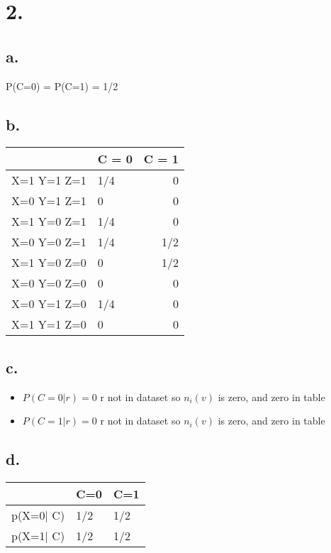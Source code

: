 \documentclass[11pt]{article}
\begin{document}
\section*{2.}
\label{sec:org259a571}
\subsection*{a.}
\label{sec:orgfb60618}
P(C=0) = P(C=1) = 1/2
\subsection*{b.}
\label{sec:org15cf63a}
\begin{center}
\begin{tabular}{l|lr}
 & C = 0 & C = 1\\
\hline
X=1 Y=1 Z=1 & 1/4 & 0\\
X=0 Y=1 Z=1 & 0 & 0\\
X=1 Y=0 Z=1 & 1/4 & 0\\
X=0 Y=0 Z=1 & 1/4 & 1/2\\
X=1 Y=0 Z=0 & 0 & 1/2\\
X=0 Y=0 Z=0 & 0 & 0\\
X=0 Y=1 Z=0 & 1/4 & 0\\
X=1 Y=1 Z=0 & 0 & 0\\
\end{tabular}
\end{center}
\subsection*{c.}
\label{sec:orge414cd4}
\begin{itemize}
\item \(P(C = 0|r) = 0\) r not in dataset so \(n_i(v)\) is zero, and zero in table
\item \(P(C = 1|r) = 0\) r not in dataset so \(n_i(v)\) is zero, and zero in table
\end{itemize}
\subsection*{d.}
\label{sec:orge2fcf1a}
\begin{center}
\begin{tabular}{l|ll}
 & C=0 & C=1\\
\hline
p(X=0\(\vert{}\) C) & 1/2 & 1/2\\
p(X=1\(\vert{}\) C) & 1/2 & 1/2\\
\end{tabular}
\end{center}
\end{document}
